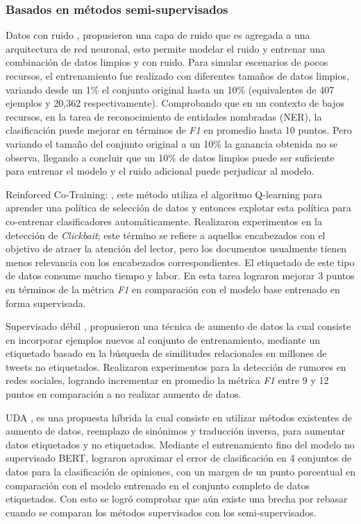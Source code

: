 \subsubsection{Basados en métodos semi-supervisados}

Datos con ruido \citep{hedderich2018training}, propusieron una capa de ruido que es agregada a una arquitectura de red neuronal, esto permite modelar el ruido y entrenar una combinación de datos limpios y con ruido. Para simular escenarios de pocos recursos, el entrenamiento fue realizado con diferentes tamaños de datos limpios, variando desde un 1\% el conjunto original hasta un 10\% (equivalentes de 407 ejemplos y 20,362 respectivamente). Comprobando que en un contexto de bajos recursos, en la tarea de reconocimiento de entidades nombradas (NER), la clasificación puede mejorar en términos de \textit{F1} en promedio hasta 10 puntos. Pero variando el tamaño del conjunto original a un 10\% la ganancia obtenida no se observa, llegando a concluir que un 10\% de datos limpios puede ser suficiente para entrenar el modelo y el ruido adicional puede perjudicar al modelo.

Reinforced Co-Training: \citep{wu2018reinforced}, este método utiliza el algoritmo Q-learning para aprender una política de selección de datos y entonces explotar esta política para co-entrenar clasificadores automáticamente. Realizaron experimentos en la detección de \textit{Clickbait}; este término se refiere a aquellos encabezados con el objetivo de atraer la atención del lector, pero los documentos usualmente tienen menos relevancia con los encabezados correspondientes. El etiquetado de este tipo de datos consume mucho tiempo y labor. En esta tarea lograron mejorar 3 puntos en términos de la métrica \textit{F1} en comparación con el modelo base entrenado en forma supervisada.

Supervisado débil \citep{han2019neural}, propusieron una técnica de aumento de datos la cual consiste en incorporar ejemplos nuevos al conjunto de entrenamiento, mediante un etiquetado basado en la búsqueda de similitudes relacionales en millones de tweets no etiquetados. Realizaron experimentos para la detección de rumores en redes sociales, logrando incrementar en promedio la métrica \textit{F1} entre 9 y 12 puntos en comparación a no realizar aumento de datos.

UDA \citep{xie2019unsupervised}, es una propuesta híbrida la cual consiste en utilizar métodos existentes de aumento de datos, reemplazo de sinónimos y traducción inversa, para aumentar datos etiquetados y no etiquetados. Mediante el entrenamiento fino del modelo no supervisado BERT, lograron aproximar el error de clasificación en 4 conjuntos de datos para la clasificación de opiniones, con un margen de un punto porcentual en comparación con el modelo entrenado en el conjunto completo de datos etiquetados. Con esto se logró comprobar que aún existe una brecha por rebasar cuando se comparan los métodos supervisados con los semi-supervisados.


